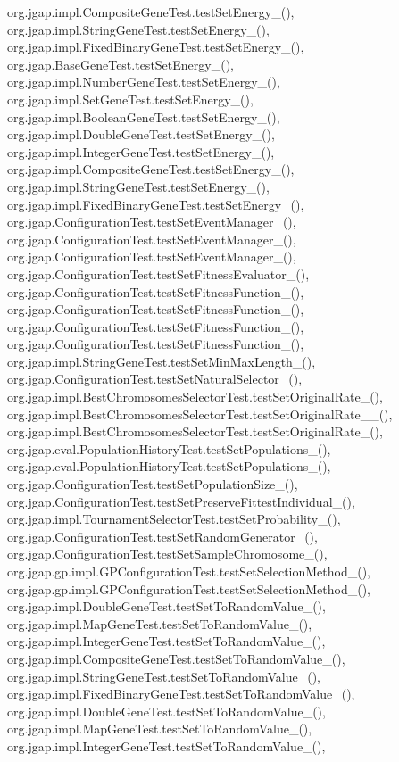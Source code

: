 org.\-jgap.\-impl.\-Composite\-Gene\-Test.\-test\-Set\-Energy\-\_(), org.\-jgap.\-impl.\-String\-Gene\-Test.\-test\-Set\-Energy\-\_(), org.\-jgap.\-impl.\-Fixed\-Binary\-Gene\-Test.\-test\-Set\-Energy\-\_(), org.\-jgap.\-Base\-Gene\-Test.\-test\-Set\-Energy\-\_(), org.\-jgap.\-impl.\-Number\-Gene\-Test.\-test\-Set\-Energy\-\_(), org.\-jgap.\-impl.\-Set\-Gene\-Test.\-test\-Set\-Energy\-\_(), org.\-jgap.\-impl.\-Boolean\-Gene\-Test.\-test\-Set\-Energy\-\_(), org.\-jgap.\-impl.\-Double\-Gene\-Test.\-test\-Set\-Energy\-\_(), org.\-jgap.\-impl.\-Integer\-Gene\-Test.\-test\-Set\-Energy\-\_(), org.\-jgap.\-impl.\-Composite\-Gene\-Test.\-test\-Set\-Energy\-\_(), org.\-jgap.\-impl.\-String\-Gene\-Test.\-test\-Set\-Energy\-\_(), org.\-jgap.\-impl.\-Fixed\-Binary\-Gene\-Test.\-test\-Set\-Energy\-\_(), org.\-jgap.\-Configuration\-Test.\-test\-Set\-Event\-Manager\-\_(), org.\-jgap.\-Configuration\-Test.\-test\-Set\-Event\-Manager\-\_(), org.\-jgap.\-Configuration\-Test.\-test\-Set\-Event\-Manager\-\_(), org.\-jgap.\-Configuration\-Test.\-test\-Set\-Fitness\-Evaluator\-\_(), org.\-jgap.\-Configuration\-Test.\-test\-Set\-Fitness\-Function\-\_(), org.\-jgap.\-Configuration\-Test.\-test\-Set\-Fitness\-Function\-\_(), org.\-jgap.\-Configuration\-Test.\-test\-Set\-Fitness\-Function\-\_(), org.\-jgap.\-Configuration\-Test.\-test\-Set\-Fitness\-Function\-\_(), org.\-jgap.\-impl.\-String\-Gene\-Test.\-test\-Set\-Min\-Max\-Length\-\_(), org.\-jgap.\-Configuration\-Test.\-test\-Set\-Natural\-Selector\-\_(), org.\-jgap.\-impl.\-Best\-Chromosomes\-Selector\-Test.\-test\-Set\-Original\-Rate\-\_(), org.\-jgap.\-impl.\-Best\-Chromosomes\-Selector\-Test.\-test\-Set\-Original\-Rate\-\_\-\_(), org.\-jgap.\-impl.\-Best\-Chromosomes\-Selector\-Test.\-test\-Set\-Original\-Rate\-\_(), org.\-jgap.\-eval.\-Population\-History\-Test.\-test\-Set\-Populations\-\_(), org.\-jgap.\-eval.\-Population\-History\-Test.\-test\-Set\-Populations\-\_(), org.\-jgap.\-Configuration\-Test.\-test\-Set\-Population\-Size\-\_(), org.\-jgap.\-Configuration\-Test.\-test\-Set\-Preserve\-Fittest\-Individual\-\_(), org.\-jgap.\-impl.\-Tournament\-Selector\-Test.\-test\-Set\-Probability\-\_(), org.\-jgap.\-Configuration\-Test.\-test\-Set\-Random\-Generator\-\_(), org.\-jgap.\-Configuration\-Test.\-test\-Set\-Sample\-Chromosome\-\_(), org.\-jgap.\-gp.\-impl.\-G\-P\-Configuration\-Test.\-test\-Set\-Selection\-Method\-\_(), org.\-jgap.\-gp.\-impl.\-G\-P\-Configuration\-Test.\-test\-Set\-Selection\-Method\-\_(), org.\-jgap.\-impl.\-Double\-Gene\-Test.\-test\-Set\-To\-Random\-Value\-\_(), org.\-jgap.\-impl.\-Map\-Gene\-Test.\-test\-Set\-To\-Random\-Value\-\_(), org.\-jgap.\-impl.\-Integer\-Gene\-Test.\-test\-Set\-To\-Random\-Value\-\_(), org.\-jgap.\-impl.\-Composite\-Gene\-Test.\-test\-Set\-To\-Random\-Value\-\_(), org.\-jgap.\-impl.\-String\-Gene\-Test.\-test\-Set\-To\-Random\-Value\-\_(), org.\-jgap.\-impl.\-Fixed\-Binary\-Gene\-Test.\-test\-Set\-To\-Random\-Value\-\_(), org.\-jgap.\-impl.\-Double\-Gene\-Test.\-test\-Set\-To\-Random\-Value\-\_(), org.\-jgap.\-impl.\-Map\-Gene\-Test.\-test\-Set\-To\-Random\-Value\-\_(), org.\-jgap.\-impl.\-Integer\-Gene\-Test.\-test\-Set\-To\-Random\-Value\-\_(), 